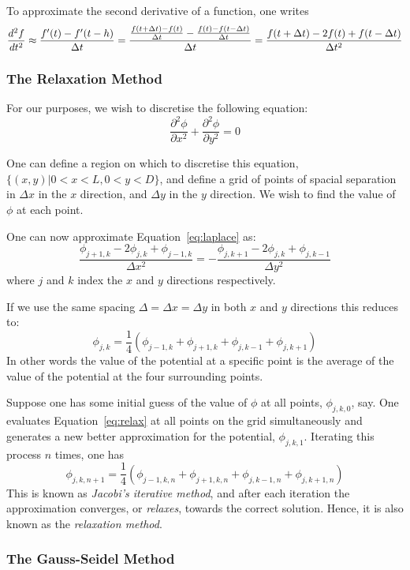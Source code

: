\documentclass[12pt, a4paper]{article}
\newcommand{\be}{\begin{equation}}
\newcommand{\ee}{\end{equation}}
\begin{document}
To approximate the second derivative of a function, one writes
%
\be
\frac{d^2 f}{dt^2} \approx \frac{f'(t) - f'(t-h)}{\Delta t} \\
= \frac{\frac{f(t +\Delta t) - f(t)}{\Delta t} - \frac{f(t) - f(t -\Delta t)}{\Delta t}}{\Delta t} \\
= \frac{f(t +\Delta t) - 2f(t) + f(t-\Delta t)}{\Delta t ^2}
\ee

\subsubsection{The Relaxation Method}

For our purposes, we wish to discretise the following equation:
% 
\be 
\frac{\partial^2 \phi}{\partial x^2}+\frac{\partial^2 \phi}{\partial y^2} = 0
\label{eq:laplace}
\ee 

One can define a region on which to discretise this equation, $\{(x,y)|0<x<L,0<y<D\}$,
and define a grid of points of spacial separation in $\Delta x$ in the $x$ direction,
and $\Delta y$ in the $y$ direction. We wish to find the value of $\phi$ at each point.

One can now approximate Equation~\ref{eq:laplace} as:
% 
\be
\frac{\phi_{j+1,k}-2\phi_{j,k}+\phi_{j-1,k}}{\Delta x^2} = - \frac{\phi_{j,k+1}-2\phi_{j,k}+\phi_{j,k-1}}{\Delta y^2}
\ee
%
where $j$ and $k$ index the $x$ and $y$ directions respectively.

If we use the same spacing $\Delta=\Delta x=\Delta y$ in both $x$ and $y$ directions this
reduces to:
%
\be
\phi_{j,k}= \frac{1}{4}(\phi_{j-1,k}+\phi_{j+1,k}+\phi_{j,k-1}+\phi_{j,k+1})
\label{eq:relax}
\ee
%
In other words the value of the potential at a specific point is the average
of the value of the potential at the four surrounding points. 

Suppose one has some initial guess of the value of $\phi$ at all points, $\phi_{j,k,0}$,
say. One evaluates Equation~\ref{eq:relax} at all points on the grid simultaneously and
generates a new better approximation for the potential, $\phi_{j,k,1}$. Iterating this
process $n$ times, one has
%
\be
\phi_{j,k,n+1}= \frac{1}{4}(\phi_{j-1,k,n}+\phi_{j+1,k,n}+\phi_{j,k-1,n}+\phi_{j,k+1,n})
\ee
%
This is known as \emph{Jacobi's iterative method}, and after each iteration the
approximation converges, or \emph{relaxes}, towards the correct solution. Hence, it is
also known as the \emph{relaxation method}.

\subsubsection{The Gauss-Seidel Method}
\end{document}
